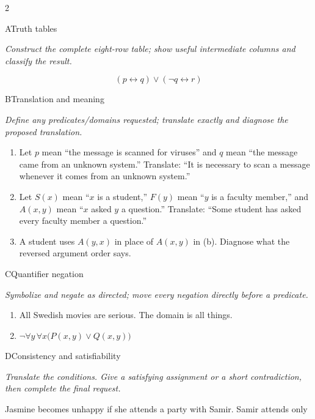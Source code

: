 \documentclass[9pt]{extarticle}
\begin{document}
\CoreWorkArea
\FormBreak
{}
\begin{multicols}{2}
\begin{CoreProblem}{A}{Truth tables}
{\scriptsize\textit{Construct the complete eight-row table; show useful intermediate columns and classify the result.}\par}
\[
  (p\leftrightarrow q)\lor(\neg q\leftrightarrow r)
\]
\end{CoreProblem}
\begin{CoreProblem}{B}{Translation and meaning}
{\scriptsize\textit{Define any predicates/domains requested; translate exactly and diagnose the proposed translation.}\par}
\begin{enumerate}[label=(\alph*)]
  \item Let $p$ mean ``the message is scanned for viruses'' and $q$ mean ``the
        message came from an unknown system.'' Translate: ``It is necessary to
        scan a message whenever it comes from an unknown system.''
  \item Let $S(x)$ mean ``$x$ is a student,'' $F(y)$ mean ``$y$ is a faculty
        member,'' and $A(x,y)$ mean ``$x$ asked $y$ a question.'' Translate:
        ``Some student has asked every faculty member a question.''
  \item A student uses $A(y,x)$ in place of $A(x,y)$ in (b). Diagnose what the
        reversed argument order says.
\end{enumerate}
\end{CoreProblem}
\begin{CoreProblem}{C}{Quantifier negation}
{\scriptsize\textit{Symbolize and negate as directed; move every negation directly before a predicate.}\par}
\begin{enumerate}[label=(\alph*)]
  \item All Swedish movies are serious. The domain is all things.
  \item $\neg\forall y\,\forall x\bigl(P(x,y)\lor Q(x,y)\bigr)$
\end{enumerate}
\end{CoreProblem}
\columnbreak
\begin{CoreProblem}{D}{Consistency and satisfiability}
{\scriptsize\textit{Translate the conditions. Give a satisfying assignment or a short contradiction, then complete the final request.}\par}
Jasmine becomes unhappy if she attends a party with Samir. Samir attends only

\end{CoreProblem}
\end{multicols}
\end{document}
